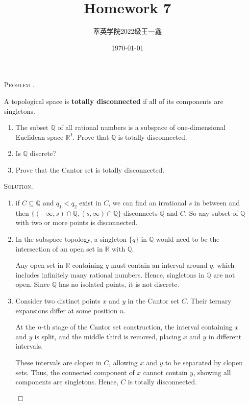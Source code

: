 \documentclass[12pt, a4paper, oneside]{ctexart}
\title{\textbf{Homework 7}}
\author{萃英学院\qquad 2022级\qquad 王一鑫}
\date{\today}
\newcounter{problemname}
\newenvironment{problem}{\begin{framed}\stepcounter{problemname}\par\noindent\textsc{Problem \arabic{problemname}. }}{\end{framed}\par}
\newenvironment{solution}{%
	\par\noindent\textsc{Solution. }\ignorespaces
}{%
	\hfill$\qed$\par
}
\begin{document}
	
	\maketitle
	
	\begin{problem}
		
    A topological space is \textbf{totally disconnected} if all of its components are singletons.

    \begin{enumerate}[(1)]
        \item The subset $\mathbb{Q}$ of all rational numbers is a subspace of one-dimensional Euclidean space $\mathbb{R}^1$. Prove that $\mathbb{Q}$ is totally disconnected.
        \item Is $\mathbb{Q}$ discrete?
        \item Prove that the Cantor set is totally disconnected.
    \end{enumerate}
        
	\end{problem}
    
	\begin{solution}
        
	    \begin{enumerate}[(1)]
            \item if $C \subseteq \mathbb{Q}$ and $q_1 < q_2$ exist in $C$, we can find an irrational 
            $s$ in between and then $\{ (-\infty, s) \cap \mathbb{Q}, (s, \infty) \cap \mathbb{Q} \}$ 
            disconnects $\mathbb{Q}$ and $C$. So any subset of $\mathbb{Q}$ with two or more points is disconnected.

            \item In the subspace topology, a singleton $\{q\}$ in $\mathbb{Q}$ would need to be the intersection of 
            an open set in $\mathbb{R}$ with $\mathbb{Q}$.

            Any open set in $\mathbb{R}$ containing $q$ must contain an interval around $q$, 
            which includes infinitely many rational numbers. Hence, singletons in $\mathbb{Q}$ are not open.
            Since $\mathbb{Q}$ has no isolated points, it is not discrete.
            
            \item Consider two distinct points $x$ and $y$ in the Cantor set $C$. 
            Their ternary expansions differ at some position $n$.

            At the $n$-th stage of the Cantor set construction, the interval containing $x$ and $y$ is split, 
            and the middle third is removed, placing $x$ and $y$ in different intervals.
            
            These intervals are clopen in $C$, allowing $x$ and $y$ to be separated by clopen sets. 
            Thus, the connected component of $x$ cannot contain $y$, showing all components are singletons. 
            Hence, $C$ is totally disconnected.
            
        \end{enumerate}
		
	\end{solution}
		
\end{document}
